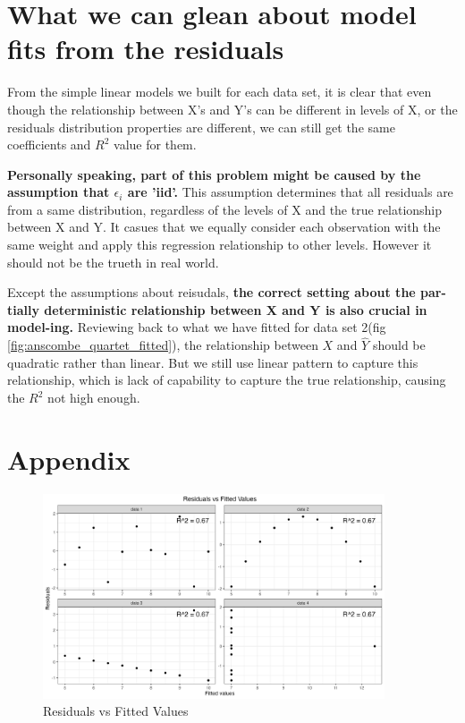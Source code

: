 \documentclass[12pt]{article}
\begin{document}
\section{What we can glean about model fits from the residuals}

From the simple linear models we built for each data set, it is clear that
even though the relationship between X's and Y's can be different in levels of X, or 
the residuals distribution properties are different, we can still get the same coefficients and 
\(R^2\) value for them. 

\textbf{Personally speaking, part of this problem might be caused by the assumption that \(\epsilon_i\) are 'iid'.} This assumption
determines that all residuals are from a same distribution, regardless of the levels of X and the true relationship
between X and Y.
It casues that we equally consider each observation with the same weight and apply this regression relationship to other levels.
However it should not be the trueth in real world.

Except the assumptions about reisudals, \textbf{the correct setting about the par-tially deterministic relationship between X and Y is 
also crucial in model-ing.} Reviewing back to what we have fitted for data set 2(fig \ref{fig:anscombe_quartet_fitted}), the relationship between \(X\) and \(\hat Y\)
should be quadratic rather than linear. But we still use linear pattern to capture this relationship, which is lack of capability to capture the true relationship, 
causing the \(R^2\) not high enough.


\clearpage


\section{Appendix}

\begin{figure}[!h]
  \centering
  \includegraphics[width=0.9\textwidth]{../results/residuals_vs_fitted.png}
  \caption{Residuals vs Fitted Values}
  \label{fig:residuals_vs_fitted}
\end{figure}
\end{document}
